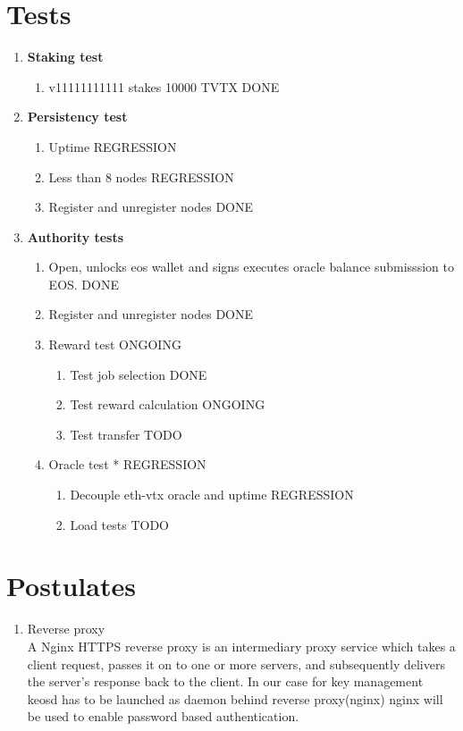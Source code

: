 \documentclass[]{article}
\begin{document}
\section{Tests}
					\begin{enumerate}
						\item \textbf{Staking test}
						\begin{enumerate}
							\item v11111111111 stakes 10000 TVTX  {\color{green} DONE}
						\end{enumerate}
						\item \textbf{Persistency test}  
							\begin{enumerate}
								\item Uptime\textit{} {\color{blue} REGRESSION}
								\item Less than 8 nodes {\color{blue} REGRESSION}
								\item Register and unregister nodes  {\color{green} DONE}
							\end{enumerate}
						\item \textbf{Authority tests}
							\begin{enumerate}
							\item Open, unlocks eos wallet and signs executes oracle balance submisssion to EOS. {\color{green} DONE}
							\item Register and unregister nodes  {\color{green} DONE}
							\item Reward test	{\color{yellow} ONGOING}
								\begin{enumerate}
										\item Test job selection {\color{green} DONE}	
										\item Test reward calculation {\color{yellow} ONGOING }	
										\item Test transfer {\color{red} TODO}

								\end{enumerate}
								\item Oracle test	* {\color{blue} REGRESSION }
							\begin{enumerate}
								\item Decouple eth-vtx oracle and uptime {\color{blue} REGRESSION }
								\item Load tests  {\color{red} TODO}
							\end{enumerate}
						\end{enumerate}
				\end{enumerate}
\section{Postulates}
\begin{enumerate} 
	\item Reverse proxy \\
	A Nginx HTTPS reverse proxy is an intermediary proxy service which takes a client request, passes it on to one or more servers, and subsequently delivers the server's response back to the client. 
	In our case for key management keosd has to be launched as daemon behind reverse proxy(nginx)
	nginx will be used to enable password based authentication.
\end{enumerate}
\end{document}
